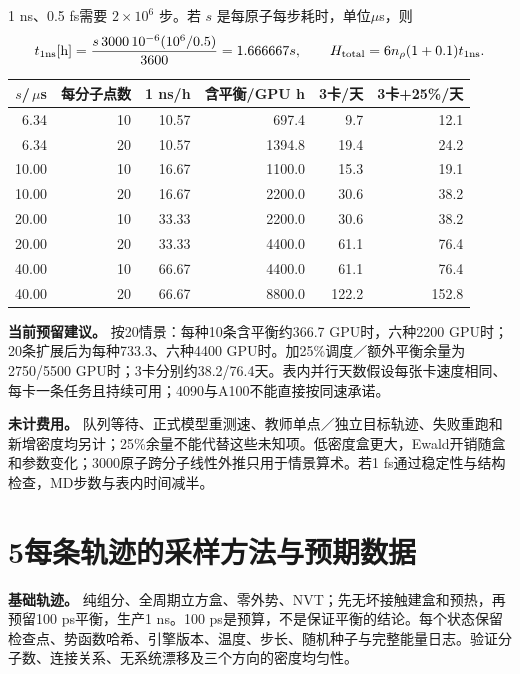 \documentclass[a4paper]{ctexart}
\begin{document}
1 ns、0.5 fs需要 $2\times10^6$ 步。若 $s$ 是每原子每步耗时，单位$\mu$s，则
\[
t_{1\rm ns}[\mathrm h]=\frac{s\,3000\,10^{-6}(10^6/0.5)}{3600}
=1.666667s,\qquad
H_{\rm total}=6n_\rho(1+0.1)t_{1\rm ns}.
\]
\begin{center}\small\begin{tabular}{rrrrrr}\toprule
$s$/\,$\mu$s & 每分子点数 & 1 ns/h & 含平衡/GPU h & 3卡/天 & 3卡+25\%/天\\\midrule
6.34 & 10 & 10.57 & 697.4 & 9.7 & 12.1 \\
6.34 & 20 & 10.57 & 1394.8 & 19.4 & 24.2 \\
10.00 & 10 & 16.67 & 1100.0 & 15.3 & 19.1 \\
10.00 & 20 & 16.67 & 2200.0 & 30.6 & 38.2 \\
20.00 & 10 & 33.33 & 2200.0 & 30.6 & 38.2 \\
20.00 & 20 & 33.33 & 4400.0 & 61.1 & 76.4 \\
40.00 & 10 & 66.67 & 4400.0 & 61.1 & 76.4 \\
40.00 & 20 & 66.67 & 8800.0 & 122.2 & 152.8 \\
\bottomrule\end{tabular}\end{center}

\textbf{当前预留建议。} 按20情景：每种10条含平衡约366.7 GPU时，六种2200 GPU时；20条扩展后为每种733.3、六种4400 GPU时。加25\%调度／额外平衡余量为2750/5500 GPU时；3卡分别约38.2/76.4天。表内并行天数假设每张卡速度相同、每卡一条任务且持续可用；4090与A100不能直接按同速承诺。

\textbf{未计费用。} 队列等待、正式模型重测速、教师单点／独立目标轨迹、失败重跑和新增密度均另计；25\%余量不能代替这些未知项。低密度盒更大，Ewald开销随盒和参数变化；3000原子跨分子线性外推只用于情景算术。若1 fs通过稳定性与结构检查，MD步数与表内时间减半。

\clearpage
\section*{5\quad 每条轨迹的采样方法与预期数据}
\textbf{基础轨迹。} 纯组分、全周期立方盒、零外势、NVT；先无坏接触建盒和预热，再预留100 ps平衡，生产1 ns。100 ps是预算，不是保证平衡的结论。每个状态保留检查点、势函数哈希、引擎版本、温度、步长、随机种子与完整能量日志。验证分子数、连接关系、无系统漂移及三个方向的密度均匀性。
\end{document}
